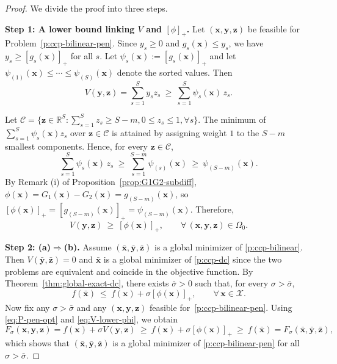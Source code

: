 \documentclass[11pt]{article}
\def\bs{\boldsymbol}
\def\Re{\mathbb{R}}
\def\C{\mathcal{C}}
\def\X{\mathcal{X}}
\begin{document}
\begin{proof}
We divide the proof into three steps.

\noindent\textbf{Step 1: A lower bound linking $V$ and $[\phi]_+$.}
Let $(\bs{x},\bs{y},\bs{z})$ be feasible for Problem~\eqref{p:ccp-bilinear-pen}. Since $y_s\ge 0$ and $g_s(\bs{x})\le y_s$, we have $y_s\ge [g_s(\bs{x})]_+$ for all $s$.
Let $\psi_s(\bs{x}):=[g_s(\bs{x})]_+$ and let $\psi_{(1)}(\bs{x})\le\cdots\le \psi_{(S)}(\bs{x})$ denote the sorted values.
Then
\[
V(\bs{y},\bs{z})=\sum_{s=1}^S y_s z_s
\ \ge\ \sum_{s=1}^S \psi_s(\bs{x})\,z_s.
\]

Let $\C = \{\bs{z}\in\Re^S:\sum_{s=1}^S z_s\ge S-m, 0\le z_s\le 1, \forall s\}$. The minimum of $\sum_{s=1}^S \psi_s(\bs{x})z_s$ over $\bs{z}\in\C$ is attained by assigning weight $1$ to the $S-m$ smallest components.
Hence, for every $\bs{z}\in\C$,
\[
\sum_{s=1}^S \psi_s(\bs{x})\,z_s\ \ge\ \sum_{s=1}^{S-m}\psi_{(s)}(\bs{x})\ \ge\ \psi_{(S-m)}(\bs{x}).
\]
By Remark (i) of Proposition~\ref{prop:G1G2-subdiff}, $\phi(\bs{x})=G_1(\bs{x})-G_2(\bs{x})=g_{(S-m)}(\bs{x})$, so
$[\phi(\bs{x})]_+=[g_{(S-m)}(\bs{x})]_+=\psi_{(S-m)}(\bs{x})$.
Therefore,
\begin{equation}\label{eq:V-lower-phi}
V(\bs{y},\bs{z})\ \ge\ [\phi(\bs{x})]_+,\qquad \forall\,(\bs{x},\bs{y},\bs{z}) \in \Omega_0.
\end{equation}

\noindent\textbf{Step 2: (a)$\Rightarrow$(b).}
Assume $(\bar{\bs{x}},\bar{\bs{y}},\bar{\bs{z}})$ is a global minimizer of \eqref{p:ccp-bilinear}. Then $V(\bar{\bs{y}},\bar{\bs{z}})=0$ and $\bar{\bs{x}}$ is a global minimizer of \eqref{p:ccp-dc} since the two problems are equivalent and coincide in the objective function.
By Theorem~\ref{thm:global-exact-dc}, there exists $\bar\sigma>0$ such that, for every $\sigma>\bar\sigma$,
\begin{equation}\label{eq:P-pen-opt}
f(\bar{\bs{x}})\ \le\ f(\bs{x})+\sigma[\phi(\bs{x})]_+,\qquad \forall\,\bs{x}\in\X.
\end{equation}
Now fix any $\sigma>\bar\sigma$ and any $(\bs{x},\bs{y},\bs{z})$ feasible for~\eqref{p:ccp-bilinear-pen}.
Using \eqref{eq:P-pen-opt} and \eqref{eq:V-lower-phi}, we obtain
\[
F_\sigma(\bs{x},\bs{y},\bs{z})
= f(\bs{x})+\sigma V(\bs{y},\bs{z})
\ \ge\ f(\bs{x})+\sigma[\phi(\bs{x})]_+
\ \ge\ f(\bar{\bs{x}})
= F_\sigma(\bar{\bs{x}},\bar{\bs{y}},\bar{\bs{z}}),
\]
which shows that $(\bar{\bs{x}},\bar{\bs{y}},\bar{\bs{z}})$ is a global minimizer of \eqref{p:ccp-bilinear-pen} for all $\sigma>\bar\sigma$.


\end{proof}
\end{document}
